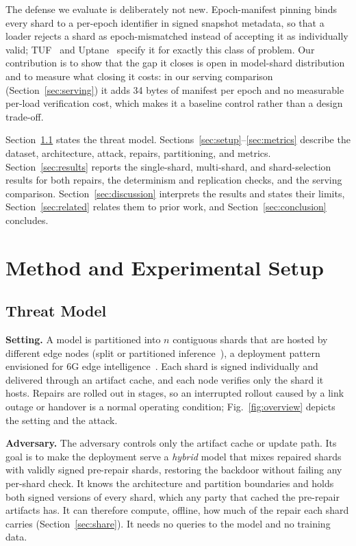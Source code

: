 \documentclass[conference,a4paper]{IEEEtran}  %
\newif\ifincludeanp      \includeanpfalse   %
\begin{document}
The defense we evaluate is deliberately not new. Epoch-manifest pinning binds
every shard to a per-epoch identifier in signed snapshot metadata, so that a
loader rejects a shard as epoch-mismatched instead of accepting it as
individually valid; TUF~\cite{tuf} and Uptane~\cite{uptane} specify it for
exactly this class of problem. Our contribution is to show that the gap it
closes is open in model-shard distribution and to measure what closing it
costs: in our serving comparison (Section~\ref{sec:serving}) it adds 34 bytes
of manifest per epoch and no measurable per-load verification cost, which makes
it a baseline control rather than a design trade-off.

Section~\ref{sec:threat} states the threat model. Sections~\ref{sec:setup}--\ref{sec:metrics}
describe the dataset, architecture, attack, repairs, partitioning, and metrics.
Section~\ref{sec:results} reports the single-shard, multi-shard, and
shard-selection results for both repairs, \ifincludeanp the contrast with a
local repair, \fi the determinism and replication checks, and the serving
comparison. Section~\ref{sec:discussion} interprets the results and states
their limits, Section~\ref{sec:related} relates them to prior work, and
Section~\ref{sec:conclusion} concludes.

\section{Method and Experimental Setup}
\label{sec:method}

\subsection{Threat Model}
\label{sec:threat}

\textbf{Setting.} A model is partitioned into $n$ contiguous shards that
are hosted by different edge nodes (split or partitioned
inference~\cite{kang2017neurosurgeon}), a deployment pattern envisioned for
6G edge intelligence~\cite{letaief2022edgeai6g}. Each shard is signed
individually and delivered through an artifact cache, and each node
verifies only the shard it hosts. Repairs are rolled out in stages, so an interrupted rollout caused by a link outage or handover is a normal operating condition; Fig.~\ref{fig:overview} depicts the setting and the attack.

\textbf{Adversary.} The adversary controls only the artifact cache or
update path. Its goal is to make the deployment serve a \emph{hybrid}
model that mixes repaired shards with validly signed pre-repair shards,
restoring the backdoor without failing any per-shard check. It knows the
architecture and partition boundaries and holds both signed versions of
every shard, which any party that cached the pre-repair artifacts has.
It can therefore compute, offline, how much of the repair each shard
carries (Section~\ref{sec:share}). It needs no queries to the model and
no training data.
\end{document}
